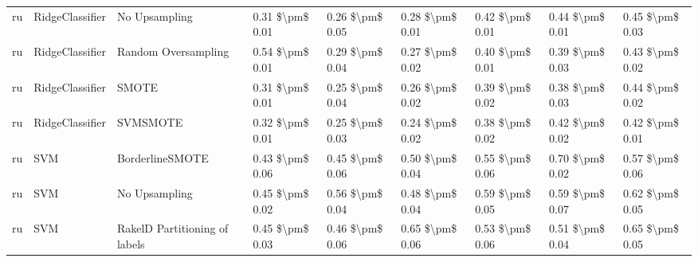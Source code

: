 \begin{tabular}{lllllllll}
      ru &                 RidgeClassifier &                 No Upsampling &     0.31 \$\textbackslash pm\$ 0.01 &           0.26 \$\textbackslash pm\$ 0.05 &       0.28 \$\textbackslash pm\$ 0.01 &        0.42 \$\textbackslash pm\$ 0.01 &                         0.44 \$\textbackslash pm\$ 0.01 &     0.45 \$\textbackslash pm\$ 0.03 \\
      ru &                 RidgeClassifier &           Random Oversampling &     0.54 \$\textbackslash pm\$ 0.01 &           0.29 \$\textbackslash pm\$ 0.04 &       0.27 \$\textbackslash pm\$ 0.02 &        0.40 \$\textbackslash pm\$ 0.01 &                         0.39 \$\textbackslash pm\$ 0.03 &     0.43 \$\textbackslash pm\$ 0.02 \\
      ru &                 RidgeClassifier &                         SMOTE &     0.31 \$\textbackslash pm\$ 0.01 &           0.25 \$\textbackslash pm\$ 0.04 &       0.26 \$\textbackslash pm\$ 0.02 &        0.39 \$\textbackslash pm\$ 0.02 &                         0.38 \$\textbackslash pm\$ 0.03 &     0.44 \$\textbackslash pm\$ 0.02 \\
      ru &                 RidgeClassifier &                      SVMSMOTE &     0.32 \$\textbackslash pm\$ 0.01 &           0.25 \$\textbackslash pm\$ 0.03 &       0.24 \$\textbackslash pm\$ 0.02 &        0.38 \$\textbackslash pm\$ 0.02 &                         0.42 \$\textbackslash pm\$ 0.02 &     0.42 \$\textbackslash pm\$ 0.01 \\
      ru &                             SVM &               BorderlineSMOTE &     0.43 \$\textbackslash pm\$ 0.06 &           0.45 \$\textbackslash pm\$ 0.06 &       0.50 \$\textbackslash pm\$ 0.04 &        0.55 \$\textbackslash pm\$ 0.06 &                         0.70 \$\textbackslash pm\$ 0.02 &     0.57 \$\textbackslash pm\$ 0.06 \\
      ru &                             SVM &                 No Upsampling &     0.45 \$\textbackslash pm\$ 0.02 &           0.56 \$\textbackslash pm\$ 0.04 &       0.48 \$\textbackslash pm\$ 0.04 &        0.59 \$\textbackslash pm\$ 0.05 &                         0.59 \$\textbackslash pm\$ 0.07 &     0.62 \$\textbackslash pm\$ 0.05 \\
      ru &                             SVM & RakelD Partitioning of labels &     0.45 \$\textbackslash pm\$ 0.03 &           0.46 \$\textbackslash pm\$ 0.06 &       0.65 \$\textbackslash pm\$ 0.06 &        0.53 \$\textbackslash pm\$ 0.06 &                         0.51 \$\textbackslash pm\$ 0.04 &     0.65 \$\textbackslash pm\$ 0.05 \\

\end{tabular}
